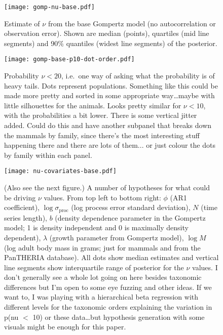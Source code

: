 \documentclass[11pt]{article}
\begin{document}
\clearpage

\begin{figure}[htbp]
\begin{center}
\texttt{[image: gomp-nu-base.pdf]}
\caption{
  Estimate of $\nu$ from the base Gompertz model (no autocorrelation or observation error).
  Shown are median (points), quartiles (mid line segments) and 90\% quantiles (widest line segments) of the posterior.}
\label{fig:nu-coefs}
\end{center}
\end{figure}

\clearpage

\begin{figure}[htbp]
\begin{center}
\texttt{[image: gomp-base-p10-dot-order.pdf]}
\caption{
  Probability $\nu<20$, i.e.\ one way of asking what the probability is of heavy tails.
  Dots represent populations.
  Something like this could be made more pretty and sorted in some appropriate way\ldots maybe with little silhouettes for the animals.
  Looks pretty similar for $\nu < 10$, with the probabilities a bit lower.
  There is some vertical jitter added. Could do this and have another subpanel that breaks down the mammals by family, since there's the most interesting stuff happening there and there are lots of them... or just colour the dots by family within each panel.}
\label{fig:dots}
\end{center}
\end{figure}

\clearpage

\begin{figure}[htbp]
\begin{center}
\texttt{[image: nu-covariates-base.pdf]}
\caption{
  (Also see the next figure.)
  A number of hypotheses for what could be driving $\nu$ values. From top left to bottom right: $\phi$ (AR1 coefficient), $\log \sigma_\mathrm{proc}$ (log process error standard deviation), $N$ (time series length), $b$ (density dependence parameter in the Gompertz model; 1 is density independent and 0 is maximally density dependent), $\lambda$ (growth parameter from Gompertz model), $\log M$ (log adult body mass in grams; just for mammals and from the PanTHERIA database).
  All dots show median estimates and vertical line segments show interquartile range of posterior for the $\nu$ values.
  I don't generally see a whole lot going on here besides taxonomic differences but I'm open to some eye fuzzing and other ideas.
  If we want to, I was playing with a hierarchical beta regression with different levels for the taxonomic orders explaining the variation in p(nu $<$ 10) or these data\ldots but hypothesis generation with some visuals might be enough for this paper.}
\label{fig:correlates}
\end{center}
\end{figure}
\end{document}
